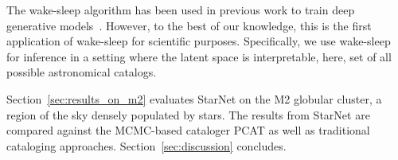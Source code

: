 The wake-sleep algorithm has been used in previous work to train deep generative models~\cite{Hinton1995wake_sleep, bornschein2014reweighted, le2018revisiting}.
However, to the best of our knowledge, this is the first application of wake-sleep for scientific purposes. 
Specifically, we use wake-sleep for inference in a setting where the latent space is interpretable, here, set of all possible astronomical catalogs. 

Section~\ref{sec:results_on_m2} evaluates StarNet on the M2 globular cluster, a region of the sky densely populated by stars. The results from StarNet are compared against the MCMC-based cataloger PCAT as well as traditional cataloging approaches. Section~\ref{sec:discussion} concludes. 




















